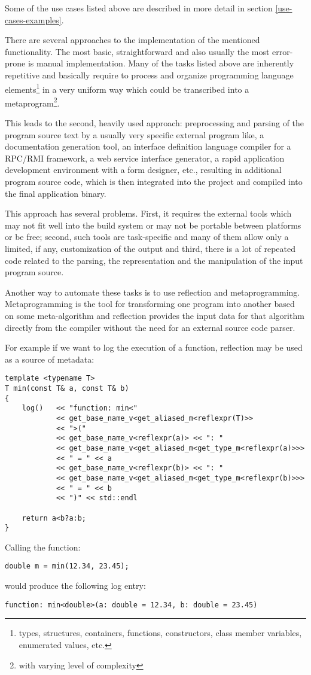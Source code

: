 Some of the use cases listed above are described in more detail in section
\ref{use-cases-examples}.

There are several approaches to the implementation of the mentioned functionality.
The most basic, straightforward and also usually the most
error-prone is manual implementation. Many of the tasks listed above
are inherently repetitive and basically require to process and organize
programming language elements\footnote{types, structures, containers, functions,
constructors, class member variables, enumerated values, etc.}
in a very uniform way which could be transcribed into a metaprogram\footnote{with
varying level of complexity}.

This leads to the second, heavily used approach: preprocessing
and parsing of the program source text by a usually very specific external
program like, a documentation generation tool, an interface definition language
compiler for a RPC/RMI framework, a web service interface generator,
a rapid application development environment with a form designer, etc.,
resulting in additional program source code, which is then integrated into
the project and compiled into the final application binary.

This approach has several problems. First, it requires the external
tools which may not fit well into the build system or may not be portable
between platforms or be free; second, such tools are task-specific
and many of them allow only a limited, if any, customization of the output
and third, there is a lot of repeated code related to the parsing, the
representation and the manipulation of the input program source.

Another way to automate these tasks is to use reflection and metaprogramming.
Metaprogramming is the tool for transforming one program into another based
on some meta-algorithm and reflection provides the input data for that algorithm
directly from the compiler without the need for an external source code parser.

For example if we want to log the execution of a function, reflection may
be used as a source of metadata:

\begin{verbatim}
template <typename T>
T min(const T& a, const T& b)
{
	log()   << "function: min<"
	        << get_base_name_v<get_aliased_m<reflexpr(T)>>
	        << ">("
	        << get_base_name_v<reflexpr(a)> << ": "
	        << get_base_name_v<get_aliased_m<get_type_m<reflexpr(a)>>>
	        << " = " << a
	        << get_base_name_v<reflexpr(b)> << ": "
	        << get_base_name_v<get_aliased_m<get_type_m<reflexpr(b)>>>
	        << " = " << b
	        << ")" << std::endl

	return a<b?a:b;
}
\end{verbatim}

Calling the \verb@min@ function:

\begin{verbatim}
double m = min(12.34, 23.45);
\end{verbatim}

would produce the following log entry:

\begin{verbatim}
function: min<double>(a: double = 12.34, b: double = 23.45)
\end{verbatim}

